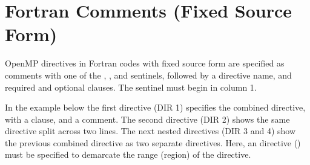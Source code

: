 \section{Fortran Comments (Fixed Source Form)}
\label{sec:fortran_fixed_format_comments}

OpenMP directives in Fortran codes with fixed source form are specified as comments with one of the
, , and  sentinels, followed by a
directive name, and required and optional clauses.  The sentinel must begin in column 1.

In the example below the first directive (DIR 1) specifies the %
 combined directive, with a  clause, and a comment.
The second directive (DIR 2) shows the same directive split
across two lines. The next nested directives (DIR 3 and 4) show the previous combined directive as
two separate directives. 
Here, an  directive () must be specified to demarcate the range (region)
of the  directive.

\clearpage
